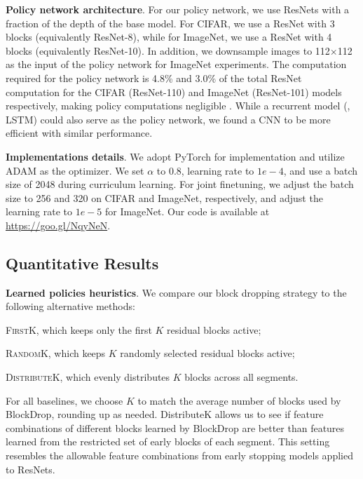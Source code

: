 \documentclass[10pt,twocolumn,letterpaper]{article}
\newcommand{\system}{BlockDrop\xspace}
\newcommand{\ZW}[1]{{\color{black}{#1}}}
\begin{document}
\vspace{0.05in}\noindent\textbf{Policy network architecture}. For our policy network, we use ResNets with a fraction of the depth of the base model. For CIFAR, we use a ResNet with 3 blocks (equivalently ResNet-8), while for ImageNet, we use a ResNet with 4 blocks (equivalently ResNet-10). In addition, we downsample images to 112$\times$112 as the input of the policy network for ImageNet experiments. The computation required for the policy network is 4.8\% and 3.0\% of the total ResNet computation for the CIFAR (ResNet-110) and ImageNet (ResNet-101) models respectively, making policy computations negligible \ZW{(it takes about 0.5 ms per image on average for ImageNet)}. While a recurrent model (\eg, LSTM) could also serve as the policy network, we found a CNN to be more efficient with similar performance.

\vspace{0.05in}\noindent\textbf{Implementations details}. We adopt PyTorch for implementation and utilize ADAM as the optimizer.  We set $\alpha$ to 0.8, learning rate to $1e-4$, and use a batch size of 2048 during curriculum learning. 
For joint finetuning, we adjust the batch size to 256 and 320 on CIFAR and ImageNet, respectively, and  adjust the learning rate to $1e-5$ for ImageNet.  Our code is available at \url{https://goo.gl/NqyNeN}.

\vspace{0.05in}\subsection{Quantitative Results}\label{sec:quant}\noindent\textbf{Learned policies \vs heuristics}. We compare our block dropping strategy to the following alternative methods:
\begin{enumerate*}[label=(\arabic*)]
\item \textsc{FirstK}, which keeps only the first $K$ residual blocks active;
\item \textsc{RandomK}, which keeps $K$ randomly selected residual blocks active; 
\item \textsc{DistributeK}, which evenly distributes $K$ blocks across all segments.
\end{enumerate*} 
For all baselines, we choose $K$ to match the average number of blocks used by \system, rounding up as needed.  %
DistributeK allows us to see if feature combinations of different blocks learned by \system are better than features learned from the restricted set of early blocks of each segment. This setting resembles the allowable feature combinations from early stopping models applied to ResNets.
\end{document}
